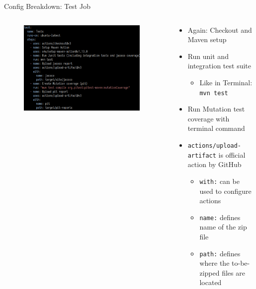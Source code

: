 \documentclass[compress,aspectratio=169]{beamer}
\begin{document}
	\begin{frame}{Config Breakdown: Test Job}
    \begin{columns}
      \begin{column}{0.5\textwidth}
        \begin{figure}
          \begin{center}
            \includegraphics[width=0.95\textwidth]{testjob.png}
          \end{center}
        \end{figure}
      \end{column}
      \begin{column}{0.5\textwidth}
        \begin{itemize}
          \item Again: Checkout and Maven setup
          \item Run unit and integration test suite
            \begin{itemize}
              \item Like in Terminal: \texttt{mvn test}
            \end{itemize}
          \item Run Mutation test coverage with terminal command
          \item \texttt{actions/upload-artifact} is official action by GitHub
            \begin{itemize}
              \item \texttt{with:} can be used to configure actions
              \item \texttt{name:} defines name of the zip file
              \item \texttt{path:} defines where the to-be-zipped files are located
            \end{itemize}
        \end{itemize}
      \end{column}
    \end{columns}
	\end{frame}
\end{document}
